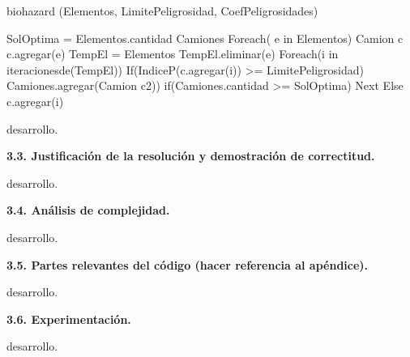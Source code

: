   biohazard (Elementos, LimitePeligrosidad, CoefPeligrosidades)

  SolOptima = Elementos.cantidad
  Camiones
    Foreach( e in Elementos){
      Camion c
      c.agregar(e)
      TempEl = Elementos
      TempEl.eliminar(e)
      Foreach(i in iteracionesde(TempEl)){
        If(IndiceP(c.agregar(i)) >= LimitePeligrosidad){
          Camiones.agregar(Camion c2))
          if(Camiones.cantidad >= SolOptima){
            Next
          }
        }
        Else{
          c.agregar(i)
        }
      }
    }
    
  

 
\vspace*{0.3cm}

desarrollo.


\vspace*{0.75cm} \noindent


\noindent
\textbf{3.3. Justificación de la resolución y demostración de correctitud.}

\vspace*{0.3cm}

desarrollo.


\vspace*{0.75cm} \noindent



\noindent
\textbf{3.4. Análisis de complejidad.}

\vspace*{0.3cm}

desarrollo.


\vspace*{0.75cm} \noindent



\noindent
\textbf{3.5. Partes relevantes del código (hacer referencia al apéndice).}

\vspace*{0.3cm}

desarrollo.


\vspace*{0.75cm} \noindent



\noindent
\textbf{3.6. Experimentación.}

\vspace*{0.3cm}

desarrollo.
